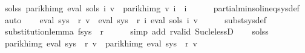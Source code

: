 \begin{isabellebody}
\ sols{\isacharunderscore}{\kern0pt}s{}{\isacharcolon}{\kern0pt}\ {\isachardoublequoteopen}parikh{\isacharunderscore}{\kern0pt}img\ {\isacharparenleft}{\kern0pt}eval\ {\isacharparenleft}{\kern0pt}sols\ i{\isacharparenright}{\kern0pt}\ v{}{\isacharparenright}{\kern0pt}\ {\isasymsubseteq}\ parikh{\isacharunderscore}{\kern0pt}img\ {\isacharparenleft}{\kern0pt}v{}\ i{\isacharparenright}{\kern0pt}{\isachardoublequoteclose}\ \ i\isanewline
\ \ \ \ \isamarkupfalse%
\ partial{\isacharunderscore}{\kern0pt}min{\isacharunderscore}{\kern0pt}sol{\isacharunderscore}{\kern0pt}ineq{\isacharunderscore}{\kern0pt}sys{\isacharunderscore}{\kern0pt}def\ \isamarkupfalse%
\ auto\isanewline
\isanewline
\ \ \isamarkupfalse%
\ {\isachardoublequoteopen}eval\ {\isacharparenleft}{\kern0pt}sys{\isacharprime}{\kern0pt}\ {\isacharbang}{\kern0pt}\ r{\isacharparenright}{\kern0pt}\ v{}\ {\isacharequal}{\kern0pt}\ eval\ {\isacharparenleft}{\kern0pt}sys\ {\isacharbang}{\kern0pt}\ r{\isacharparenright}{\kern0pt}\ {\isacharparenleft}{\kern0pt}{\isasymlambda}i{\isachardot}{\kern0pt}\ eval\ {\isacharparenleft}{\kern0pt}sols\ i{\isacharparenright}{\kern0pt}\ v{}{\isacharparenright}{\kern0pt}{\isachardoublequoteclose}\isanewline
\ \ \ \ \isamarkupfalse%
\ subst{\isacharunderscore}{\kern0pt}sys{\isacharunderscore}{\kern0pt}def\ \isamarkupfalse%
\ substitution{\isacharunderscore}{\kern0pt}lemma{\isacharbrackleft}{\kern0pt}\ f{\isacharequal}{\kern0pt}{\isachardoublequoteopen}sys\ {\isacharbang}{\kern0pt}\ r{\isachardoublequoteclose}{\isacharbrackright}{\kern0pt}\isanewline
\ \ \ \ \isamarkupfalse%
\ {\isacharparenleft}{\kern0pt}simp\ add{\isacharcolon}{\kern0pt}\ r{\isacharunderscore}{\kern0pt}valid\ Suc{\isacharunderscore}{\kern0pt}le{\isacharunderscore}{\kern0pt}lessD{\isacharparenright}{\kern0pt}\isanewline
\ \ \isamarkupfalse%
\ sols{\isacharunderscore}{\kern0pt}s{}\ \isamarkupfalse%
\ {\isachardoublequoteopen}parikh{\isacharunderscore}{\kern0pt}img\ {\isacharparenleft}{\kern0pt}eval\ {\isacharparenleft}{\kern0pt}sys{\isacharprime}{\kern0pt}\ {\isacharbang}{\kern0pt}\ r{\isacharparenright}{\kern0pt}\ v{}{\isacharparenright}{\kern0pt}\ {\isasymsubseteq}\ parikh{\isacharunderscore}{\kern0pt}img\ {\isacharparenleft}{\kern0pt}eval\ {\isacharparenleft}{\kern0pt}sys\ {\isacharbang}{\kern0pt}\ r{\isacharparenright}{\kern0pt}\ v{}{\isacharparenright}{\kern0pt}{\isachardoublequoteclose}\isanewline

\end{isabellebody}
